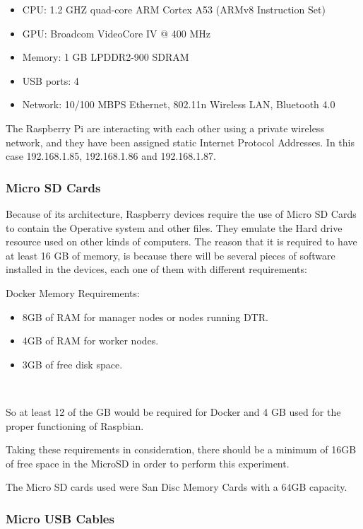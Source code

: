 \documentclass[sigconf]{acmart}
\begin{document}
	\begin{itemize}
		\item CPU: 1.2 GHZ quad-core ARM Cortex A53 (ARMv8 Instruction Set)
		\item GPU: Broadcom VideoCore IV @ 400 MHz
		\item Memory: 1 GB LPDDR2-900 SDRAM
		\item USB ports: 4
		\item Network: 10/100 MBPS Ethernet, 802.11n Wireless LAN, Bluetooth 4.0
	\end{itemize}
	\cite{hackaday2016}  
	
	The Raspberry Pi are interacting with each other using a private wireless network, and they have been assigned static Internet Protocol Addresses. In this case 192.168.1.85, 192.168.1.86 and 192.168.1.87.
	
	
	\subsubsection{Micro SD Cards}
	
	Because of its architecture, Raspberry devices require the use of Micro SD Cards to contain the Operative system and other files. They emulate the Hard drive resource used on other kinds of computers.
	The reason that it is required to have at least 16 GB of memory, is because there will be several pieces of software installed in the devices, each one of them with different requirements:
	
	Docker Memory Requirements:
	\begin{itemize}
	\item 8GB of RAM for manager nodes or nodes running DTR.
	\item 4GB of RAM for worker nodes.
	\item 3GB of free disk space.
	\end{itemize}

	~\cite{dockerdoc2017}
	
	So at least 12 of the GB would be required for Docker and 4 GB used for the proper functioning of Raspbian. \cite{rpicards2017}
	
	Taking these requirements in consideration, there should be a minimum of 16GB of free space in the MicroSD in order to perform this experiment. 
	
	The Micro SD cards used were San Disc Memory Cards with a 64GB capacity.
	
	\subsubsection{Micro USB Cables}
	
\end{document}
